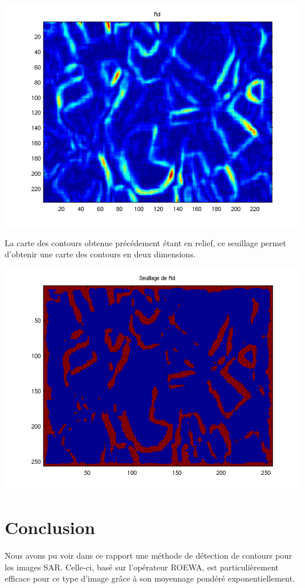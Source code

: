 \documentclass[a4paper,11pt]{article}
\newcommand{\FSource}[1]{%
  
  }
\begin{document}
\includegraphics[width=15cm]{capture4/partie4_07.png}

\FSource{matlab4/4.m}

La carte des contours obtenue précédement étant en relief, ce seuillage permet
d'obtenir une carte des contours en deux dimensions.

\includegraphics[width=15cm]{capture4/partie4_08.png}


\newpage

\section{Conclusion}
Nous avons pu voir dans ce rapport une méthode de détection de contours pour les
images SAR. Celle-ci, basé sur l'opérateur ROEWA, est particulièrement efficace
pour ce type d'image grâce à son moyennage pondéré exponentiellement.
\end{document}
